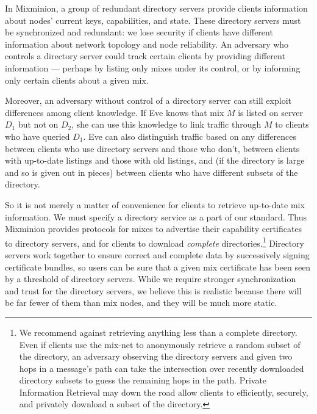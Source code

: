 \documentclass[11pt]{IEEEtran}
\begin{document}
In Mixminion, a group of redundant directory servers provide clients
information about nodes' current keys, capabilities, and state.
These directory servers must be synchronized and redundant: we lose security if
clients have different information about network topology and node
reliability. An adversary who controls a directory server could track
certain clients by providing different information --- perhaps by listing
only mixes under its control, or by informing only certain clients about a
given mix.

Moreover, an adversary without control of a directory server can still exploit
differences among client knowledge. If Eve knows that mix $M$ is listed
on server $D_1$ but not on $D_2$, she can use this knowledge to link
traffic through $M$ to clients who have queried $D_1$.  Eve can also
distinguish traffic based on any differences between clients who use
directory servers and those who don't, between clients with up-to-date
listings and those with old listings, and (if the directory is large
and so is given out in pieces) between clients who have different subsets
of the directory.

So it is not merely a matter of convenience for clients to retrieve
up-to-date mix information.
We must specify a directory
service as a part of our standard. Thus Mixminion provides protocols for
mixes to advertise their capability certificates to directory servers,
and for clients to download \emph{complete} directories.\footnote{
  We recommend against retrieving anything less than a complete directory.
  Even if clients use the mix-net to anonymously retrieve a random
  subset of the directory, an adversary observing the directory servers
  and given two hops in a message's path can take the intersection over
  recently downloaded directory subsets to guess the remaining hops in
  the path. Private Information Retrieval \cite{malkin-thesis} may down
  the road allow clients to efficiently, securely, and privately download
  a subset of the directory.
}
Directory servers work together to ensure correct and complete data by
successively signing certificate bundles, so users can be sure that a
given mix certificate has been seen by a threshold of directory servers.
While we require stronger synchronization and trust for the directory
servers, we believe this is realistic because there will be far fewer
of them than mix nodes, and they will be much more static.
\end{document}
